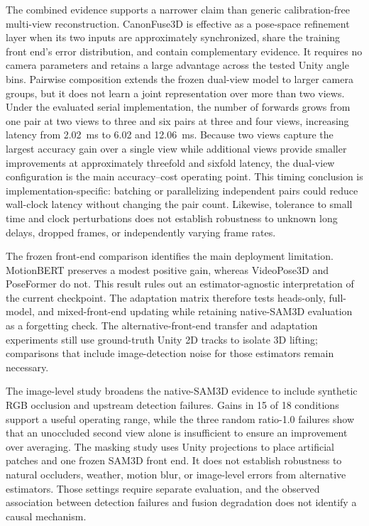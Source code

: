 \documentclass[preprint,12pt]{elsarticle}
\begin{document}
The combined evidence supports a narrower claim than generic calibration-free multi-view reconstruction. CanonFuse3D is effective as a pose-space refinement layer when its two inputs are approximately synchronized, share the training front end's error distribution, and contain complementary evidence. It requires no camera parameters and retains a large advantage across the tested Unity angle bins. Pairwise composition extends the frozen dual-view model to larger camera groups, but it does not learn a joint representation over more than two views. Under the evaluated serial implementation, the number of forwards grows from one pair at two views to three and six pairs at three and four views, increasing latency from 2.02~ms to 6.02 and 12.06~ms. Because two views capture the largest accuracy gain over a single view while additional views provide smaller improvements at approximately threefold and sixfold latency, the dual-view configuration is the main accuracy--cost operating point. This timing conclusion is implementation-specific: batching or parallelizing independent pairs could reduce wall-clock latency without changing the pair count. Likewise, tolerance to small time and clock perturbations does not establish robustness to unknown long delays, dropped frames, or independently varying frame rates.

The frozen front-end comparison identifies the main deployment limitation. MotionBERT preserves a modest positive gain, whereas VideoPose3D and PoseFormer do not. This result rules out an estimator-agnostic interpretation of the current checkpoint. The adaptation matrix therefore tests heads-only, full-model, and mixed-front-end updating while retaining native-SAM3D evaluation as a forgetting check. The alternative-front-end transfer and adaptation experiments still use ground-truth Unity 2D tracks to isolate 3D lifting; comparisons that include image-detection noise for those estimators remain necessary.

The image-level study broadens the native-SAM3D evidence to include synthetic RGB occlusion and upstream detection failures. Gains in 15 of 18 conditions support a useful operating range, while the three random ratio-1.0 failures show that an unoccluded second view alone is insufficient to ensure an improvement over averaging. The masking study uses Unity projections to place artificial patches and one frozen SAM3D front end. It does not establish robustness to natural occluders, weather, motion blur, or image-level errors from alternative estimators. Those settings require separate evaluation, and the observed association between detection failures and fusion degradation does not identify a causal mechanism.
\end{document}
